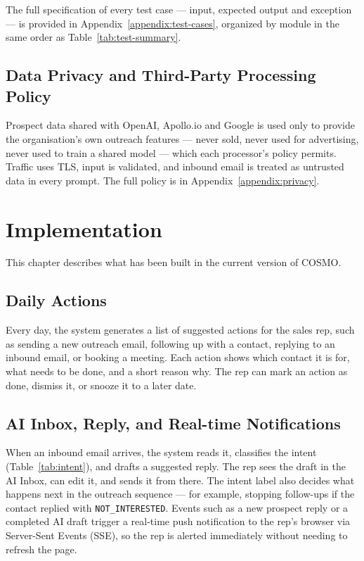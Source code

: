 \documentclass[a4paper]{article}
\begin{document}
The full specification of every test case --- input, expected output
and exception --- is provided in Appendix~\ref{appendix:test-cases},
organized by module in the same order as
Table~\ref{tab:test-summary}.


\subsection{Data Privacy and Third-Party Processing Policy}

Prospect data shared with OpenAI, Apollo.io and Google is used only to provide
the organisation's own outreach features --- never sold, never used for
advertising, never used to train a shared model --- which each processor's
policy permits. Traffic uses TLS, input is validated, and inbound email is
treated as untrusted data in every prompt. The full policy is in
Appendix~\ref{appendix:privacy}.

\newpage

\section{Implementation}
\label{ch:implementation}

This chapter describes what has been built in the current version of COSMO.

\subsection{Daily Actions}
Every day, the system generates a list of suggested actions for the sales rep,
such as sending a new outreach email, following up with a contact, replying to
an inbound email, or booking a meeting. Each action shows which contact it is
for, what needs to be done, and a short reason why. The rep can mark an action
as done, dismiss it, or snooze it to a later date.

\subsection{AI Inbox, Reply, and Real-time Notifications}
When an inbound email arrives, the system reads it, classifies the intent
(Table~\ref{tab:intent}), and drafts a suggested reply. The rep sees the draft
in the AI Inbox, can edit it, and sends it from there. The intent label also
decides what happens next in the outreach sequence — for example, stopping
follow-ups if the contact replied with \texttt{NOT\_INTERESTED}. Events such
as a new prospect reply or a completed AI draft trigger a real-time push
notification to the rep's browser via Server-Sent Events (SSE), so the rep
is alerted immediately without needing to refresh the page.
\end{document}
